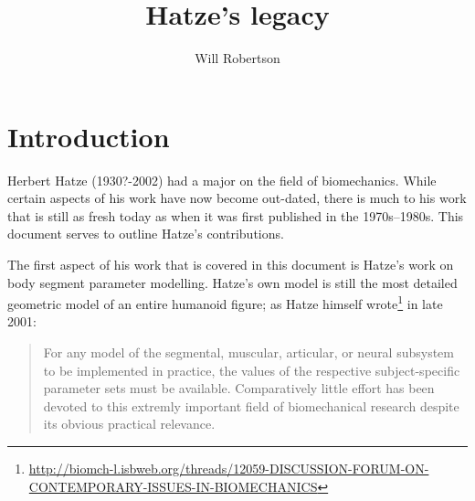 \documentclass[a4paper]{article}
\begin{document}
\title{Hatze's legacy}
\author{Will Robertson}
\maketitle

\section{Introduction}

Herbert Hatze (1930?-2002) had a major on the field of biomechanics.
While certain aspects of his work have now become out-dated, there is much to his work that is still as fresh today as when it was first published in the 1970s--1980s.
This document serves to outline Hatze's contributions.

The first aspect of his work that is covered in this document is Hatze's work on body segment parameter modelling.
Hatze's own model \parencite{hatze1979-techreport} is still the most detailed geometric model of an entire humanoid figure; as Hatze himself wrote\footnote{\url{http://biomch-l.isbweb.org/threads/12059-DISCUSSION-FORUM-ON-CONTEMPORARY-ISSUES-IN-BIOMECHANICS}} in late 2001:
\begin{quote}
For any model of the segmental, muscular, articular, or neural subsystem
to be implemented in practice, the values of the respective
subject-specific parameter sets must be available.
Comparatively little
effort has been devoted to this extremly important field of
biomechanical research despite its obvious practical relevance.
\end{quote}

\printbibliography
\end{document}
